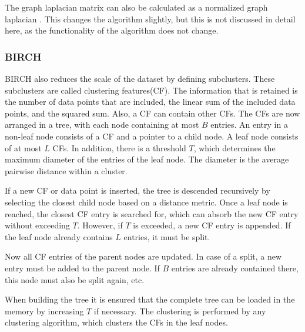 The graph laplacian matrix can also be calculated as a normalized graph laplacian \cite{spectral_clustering}.
This changes the algorithm slightly, but this is not discussed in detail here, as the functionality of the algorithm does not change.

\subsubsection{BIRCH}
BIRCH also reduces the scale of the dataset by defining subclusters.
These subclusters are called clustering features(CF).
The information that is retained is the number of data points that are included, the linear sum of the included data points, and the squared sum.
Also, a CF can contain other CFs.
The CFs are now arranged in a tree, with each node containing at most $B$ entries.
An entry in a non-leaf node consists of a CF and a pointer to a child node.
A leaf node consists of at most $L$ CFs.
In addition, there is a threshold $T$, which determines the maximum diameter of the entries of the leaf node.
The diameter is the average pairwise distance within a cluster.

If a new CF or data point is inserted, the tree is descended recursively by selecting the closest child node based on a distance metric.
Once a leaf node is reached, the closest CF entry is searched for, which can absorb the new CF entry without exceeding $T$.
However, if $T$ is exceeded, a new CF entry is appended.
If the leaf node already contains $L$ entries, it must be split.

Now all CF entries of the parent nodes are updated.
In case of a split, a new entry must be added to the parent node.
If $B$ entries are already contained there, this node must also be split again, etc.

When building the tree it is ensured that the complete tree can be loaded in the memory by increasing $T$ if necessary.
The clustering is performed by any clustering algorithm, which clusters the CFs in the leaf nodes.\cite{birch}